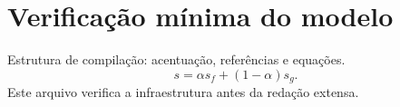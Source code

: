 \documentclass[12pt,a4paper,oneside]{report}
\begin{document}
\chapter{Verificação mínima do modelo}
Estrutura de compilação: acentuação, referências e equações.
\[s=\alpha s_f+(1-\alpha)s_g.\]
Este arquivo verifica a infraestrutura antes da redação extensa.
\end{document}

